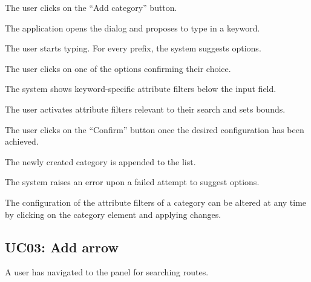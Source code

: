 
\begin{ucenumerate}
\item The user clicks on the ``Add category'' button.
\item The application opens the dialog and proposes to type in a keyword.
\item The user starts typing. For every prefix, the system suggests options.
\item The user clicks on one of the options confirming their choice.
\item The system shows keyword-specific attribute filters below the input field.
\item The user activates attribute filters relevant to their search and sets bounds.
\item The user clicks on the ``Confirm'' button once the desired configuration has been achieved.
\end{ucenumerate}


\begin{ucitemize}
\item The newly created category is appended to the list.
\end{ucitemize}


\begin{ucitemize}
\item The system raises an error upon a failed attempt to suggest options.
\end{ucitemize}


\begin{ucitemize}
\item The configuration of the attribute filters of a category can be altered at any time by clicking on the category element and applying changes.
\end{ucitemize}

\subsection{UC03: Add arrow}\label{sssec:uc-add-arrow}


\begin{ucitemize}
\item A user has navigated to the panel for searching routes.
\end{ucitemize}

